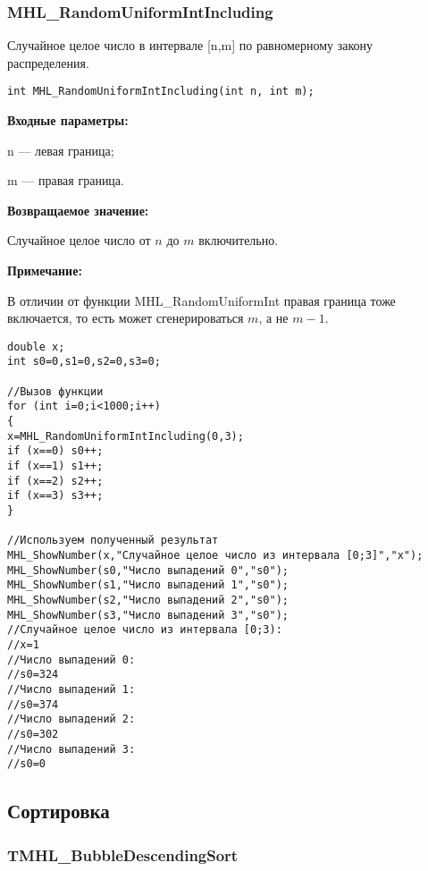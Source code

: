 \documentclass[a4paper,12pt]{article}
\begin{document}
\subsubsection{MHL\_RandomUniformIntIncluding}\label{MHL_RandomUniformIntIncluding}

Случайное целое число в интервале [n,m] по равномерному закону распределения.


\begin{lstlisting}[label=code_syntax_MHL_RandomUniformIntIncluding,caption=Синтаксис]
int MHL_RandomUniformIntIncluding(int n, int m);
\end{lstlisting}

\textbf{Входные параметры:}

n --- левая граница;

 m --- правая граница.

\textbf{Возвращаемое значение:}

Случайное целое число от $n$ до $m$ включительно.

\textbf{Примечание:}

 В отличии от функции MHL\_RandomUniformInt правая граница тоже включается, то есть может сгенерироваться $m$, а не $m-1$.


\begin{lstlisting}[label=code_use_MHL_RandomUniformIntIncluding,caption=Пример использования]
double x;
int s0=0,s1=0,s2=0,s3=0;

//Вызов функции
for (int i=0;i<1000;i++)
{
x=MHL_RandomUniformIntIncluding(0,3);
if (x==0) s0++;
if (x==1) s1++;
if (x==2) s2++;
if (x==3) s3++;
}

//Используем полученный результат
MHL_ShowNumber(x,"Случайное целое число из интервала [0;3]","x");
MHL_ShowNumber(s0,"Число выпадений 0","s0");
MHL_ShowNumber(s1,"Число выпадений 1","s0");
MHL_ShowNumber(s2,"Число выпадений 2","s0");
MHL_ShowNumber(s3,"Число выпадений 3","s0");
//Случайное целое число из интервала [0;3):
//x=1
//Число выпадений 0:
//s0=324
//Число выпадений 1:
//s0=374
//Число выпадений 2:
//s0=302
//Число выпадений 3:
//s0=0
\end{lstlisting}

\subsection{Сортировка}

\subsubsection{TMHL\_BubbleDescendingSort}\label{TMHL_BubbleDescendingSort}
\end{document}
